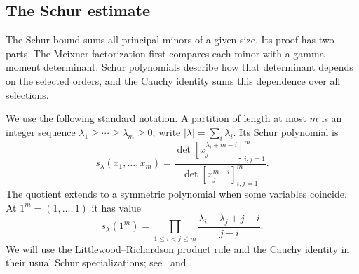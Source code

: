 \subsection{The Schur estimate}\label{app:schur-proof}
The Schur bound sums all principal minors of a given size. Its proof has
two parts. The Meixner factorization first compares each minor with a
gamma moment determinant. Schur polynomials describe how that determinant
depends on the selected orders, and the Cauchy identity sums this
dependence over all selections.

We use the following standard notation. A partition of length at most
$m$ is an integer sequence $\lambda_1\geq\cdots\geq\lambda_m\geq0$;
write $|\lambda|=\sum_i\lambda_i$. Its Schur polynomial is
\[
 s_\lambda(x_1,\ldots,x_m)
 =\frac{\det[x_j^{\lambda_i+m-i}]_{i,j=1}^m}
        {\det[x_j^{m-i}]_{i,j=1}^m}.
\]
The quotient extends to a symmetric polynomial when some variables
coincide. At $1^m=(1,\ldots,1)$ it has value
\begin{equation}\label{eq:schur-dimension}
 s_\lambda(1^m)
 =\prod_{1\leq i<j\leq m}
       \frac{\lambda_i-\lambda_j+j-i}{j-i}.
\end{equation}
We will use the Littlewood--Richardson product rule and the Cauchy
identity in their usual Schur specializations; see~\cite{fulton} and
\cite[Section~2]{forresterwarnaar}.

